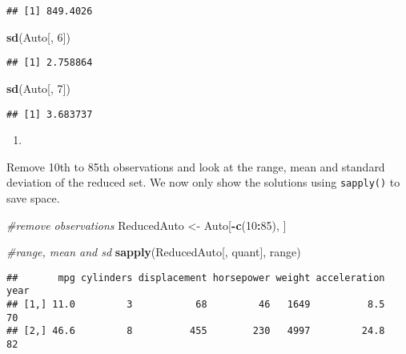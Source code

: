 \documentclass[
]{article}
\newenvironment{Shaded}{\begin{snugshade}}{\end{snugshade}}
\newcommand{\CommentTok}[1]{\textcolor[rgb]{0.56,0.35,0.01}{\textit{#1}}}
\newcommand{\DecValTok}[1]{\textcolor[rgb]{0.00,0.00,0.81}{#1}}
\newcommand{\FunctionTok}[1]{\textcolor[rgb]{0.13,0.29,0.53}{\textbf{#1}}}
\newcommand{\NormalTok}[1]{#1}
\newcommand{\OtherTok}[1]{\textcolor[rgb]{0.56,0.35,0.01}{#1}}
\newcommand{\SpecialCharTok}[1]{\textcolor[rgb]{0.81,0.36,0.00}{\textbf{#1}}}
\providecommand{\tightlist}{%
  \setlength{\itemsep}{0pt}\setlength{\parskip}{0pt}}
\begin{document}
\begin{verbatim}
## [1] 849.4026
\end{verbatim}

\begin{Shaded}
\begin{Highlighting}[]
\FunctionTok{sd}\NormalTok{(Auto[, }\DecValTok{6}\NormalTok{])}
\end{Highlighting}
\end{Shaded}

\begin{verbatim}
## [1] 2.758864
\end{verbatim}

\begin{Shaded}
\begin{Highlighting}[]
\FunctionTok{sd}\NormalTok{(Auto[, }\DecValTok{7}\NormalTok{])}
\end{Highlighting}
\end{Shaded}

\begin{verbatim}
## [1] 3.683737
\end{verbatim}

\begin{enumerate}
\def\labelenumi{\alph{enumi})}
\setcounter{enumi}{3}
\tightlist
\item
\end{enumerate}

Remove 10th to 85th observations and look at the range, mean and
standard deviation of the reduced set. We now only show the solutions
using \texttt{sapply()} to save space.

\begin{Shaded}
\begin{Highlighting}[]
\CommentTok{\#remove observations}
\NormalTok{ReducedAuto }\OtherTok{\textless{}{-}}\NormalTok{ Auto[}\SpecialCharTok{{-}}\FunctionTok{c}\NormalTok{(}\DecValTok{10}\SpecialCharTok{:}\DecValTok{85}\NormalTok{), ]}

\CommentTok{\#range, mean and sd}
\FunctionTok{sapply}\NormalTok{(ReducedAuto[, quant], range)}
\end{Highlighting}
\end{Shaded}

\begin{verbatim}
##       mpg cylinders displacement horsepower weight acceleration year
## [1,] 11.0         3           68         46   1649          8.5   70
## [2,] 46.6         8          455        230   4997         24.8   82
\end{verbatim}
\end{document}
